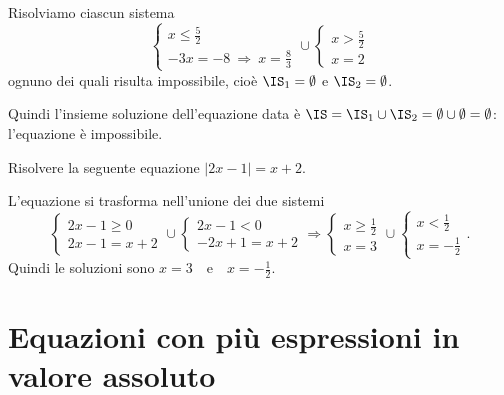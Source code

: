 \begin{exrig}
\begin{esempio}
Risolviamo ciascun sistema 
\[\left\{\begin{array}{l}{x\le \frac 5 2}\\{-3x=-8\:\Rightarrow\: x=\frac 8 3}\end{array}\right.\cup \left\{\begin{array}{l}{x>\frac 5 2}\\{x=2}\end{array}\right.\] 
ognuno dei quali risulta impossibile, cioè $\IS_1=\emptyset$ e $\IS_2=\emptyset $.

Quindi l'insieme soluzione dell'equazione data è $\IS=\IS_1\cup \IS_2=\emptyset \cup \emptyset =\emptyset $: l'equazione è impossibile.
\end{esempio}

\begin{esempio}
Risolvere la seguente equazione $\left|2x-1\right|=x+2$.

L'equazione si trasforma nell'unione dei due sistemi 
\[ \left\{\begin{array}{l}{2x-1\ge 0}\\{2x-1=x+2}\end{array}\right.\cup \left\{\begin{array}{l}{2x-1<0}\\{-2x+1=x+2}\end{array}\right.\Rightarrow
\left\{\begin{array}{l}{x\ge \frac 1 2}\\{x=3}\end{array}\right.\cup \left\{\begin{array}{l}{x<\frac 1 2}\\{x=-\frac 1 2}\end{array}\right..\] 
Quindi le soluzioni sono $x=3$~~e~~$x=-\frac 1 2$.
\end{esempio}
\end{exrig}
\ovalbox{\risolvii \ref{ese:7.8}, \ref{ese:7.9}, \ref{ese:7.10}, \ref{ese:7.11}, \ref{ese:7.12}, \ref{ese:7.13}, \ref{ese:7.14}, \ref{ese:7.15}}

\section{Equazioni con più espressioni in valore assoluto}

